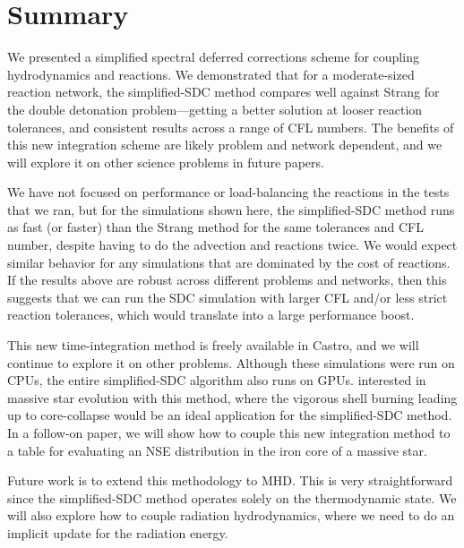 \documentclass[times,preprint]{aastex631}
\newcommand{\castro}{{\sf Castro}}
\begin{document}
\section{Summary}

We presented a simplified spectral deferred corrections scheme for coupling
hydrodynamics and reactions.  We demonstrated that for a moderate-sized reaction
network, the simplified-SDC method compares well against Strang for the double
detonation problem---getting a better solution at looser reaction tolerances,
and consistent results across a range of CFL numbers.  The benefits of this new
integration scheme are likely problem and network dependent, and we will explore
it on other science problems in future papers.

We have not focused on performance or load-balancing the reactions in
the tests that we ran, but for the simulations shown here,
the simplified-SDC method runs as fast (or faster) than the Strang method
for the same tolerances and CFL number, despite having to do the advection and reactions
twice.  We would expect similar behavior for any simulations that are
dominated by the cost of reactions.  If the results above are robust across
different problems and networks, then this suggests that we can run
the SDC simulation with larger CFL and/or less strict reaction tolerances,
which would translate into a large performance boost.

This new time-integration method is freely available in \castro, and
we will continue to explore it on other problems.  Although these simulations
were run on CPUs, the entire simplified-SDC algorithm also runs on GPUs.
interested in massive star evolution with this method, where the
vigorous shell burning leading up to core-collapse would be an ideal
application for the simplified-SDC method.  In a follow-on paper, we
will show how to couple this new integration method to a table for
evaluating an NSE distribution in the iron core of a massive star.

Future work is to extend this methodology to MHD.  This is very
straightforward since the simplified-SDC method operates solely on the
thermodynamic state.  We will also explore how to couple radiation
hydrodynamics, where we need to do an implicit update for the
radiation energy.
\end{document}
